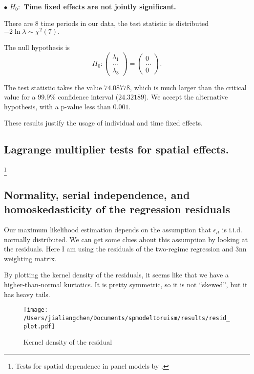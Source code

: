 \documentclass[11pt,a4paper]{amsart}
\theoremstyle{plain}
\theoremstyle{definition}
\begin{document}
$\bullet$ \textbf{$H_{0}:$ Time fixed effects are not jointly significant.} 
		
There are $8$ time periods in our data, the test statistic is distributed  $-2 \ln \lambda \sim \chi^{2}(7).$
		
The null hypothesis is 
\[	H_{0}: \begin{pmatrix}
		\lambda_{1} \\
		\dots \\
		\lambda_{8}
\end{pmatrix} = \begin{pmatrix}
		0 \\
		\dots \\
		0
\end{pmatrix}.	\]
		
The test statistic takes the value $74.08778$, which is much larger than the critical value for a 99.9\% confidence interval ($24.32189$). We accept the alternative hypothesis, with a p-value less than $0.001$.
		
These results justify the usage of individual and time fixed effects. 
		
\subsection{Lagrange multiplier tests for spatial effects.}\footnote{Tests for spatial dependence in panel models by \parencite{anselinSpatialPanelEconometrics2008}.}\hfill\par
		
\subsection{Normality, serial independence, and homoskedasticity of the regression residuals}

Our maximum likelihood estimation depends on the assumption that $\epsilon_{it}$ is i.i.d. normally distributed. We can get some clues about this assumption by looking at the residuals. Here I am using the residuals of the two-regime regression and 3nn weighting matrix. 

By plotting the kernel density of the residuals, it seems like that we have a higher-than-normal kurtotics. It is pretty symmetric, so it is not ``skewed'', but it has heavy tails.

\begin{figure}[hbt]
	{\centering \texttt{[image: /Users/jialiangchen/Documents/spmodeltoruism/results/resid\_plot.pdf]}}
	\caption{Kernel density of the residual}\label{F:kden_resid}
\end{figure}
\end{document}
